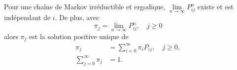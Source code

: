 \begin{theoreme}{}{}
	Pour une chaîne de Markov irréductible et ergodique, $\lim\limits_{n\to \infty}P_{ij}^n$ existe et est indépendant de $i$. De plus, avec 
	$$\pi_j = \lim\limits_{n\to\infty}P_{ij}^n, \quad j\geq 0$$
	alors $\pi_j$ est la solution positive unique de 
	\begin{align*}
	\pi_j &= \sum_{i = 0}^{\infty} \pi_iP_{ij}, \quad j\geq 0,\\
	\sum_{j = 0}^{\infty}\pi_j &= 1. 
	\end{align*}
\end{theoreme}




















